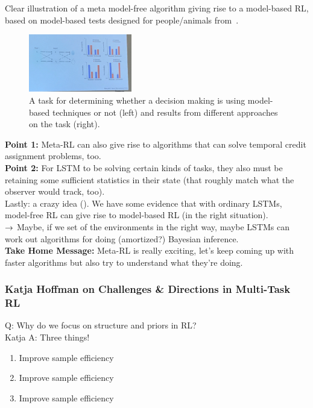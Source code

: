 Clear illustration of a meta model-free algorithm giving rise to a model-based RL, based on model-based tests designed for people/animals from~\citet{daw2014algorithmic}. \\

\begin{figure}[h!]
    \centering
    \includegraphics[width=0.4\textwidth]{images/mb_task.png}
    \caption{A task for determining whether a decision making is using model-based techniques or not (left) and results from different approaches on the task (right).}
    \label{fig:mb_task}
\end{figure}

{\bf Point 1:} Meta-RL can also give rise to algorithms that can solve temporal credit assignment problems, too. \\

{\bf Point 2:} For LSTM to be solving certain kinds of tasks, they also must be retaining some sufficient statistics in their state (that roughly match what the observer would track, too). \\

Lastly: a crazy idea (). We have some evidence that with ordinary LSTMs, model-free RL can give rise to model-based RL (in the right situation). \\

$\rightarrow$ Maybe, if we set of the environments in the right way, maybe LSTMs can work out algorithms for doing (amortized?) Bayesian inference. \\

{\bf Take Home Message:} Meta-RL is really exciting, let's keep coming up with faster algorithms but also try to understand what they're doing.

\subsubsection{Katja Hoffman on Challenges \& Directions in Multi-Task RL}

Q: Why do we focus on structure and priors in RL? \\

Katja A: Three things!
\begin{enumerate}
    \item Improve sample efficiency
    \item Improve sample efficiency
    \item Improve sample efficiency
\end{enumerate}

